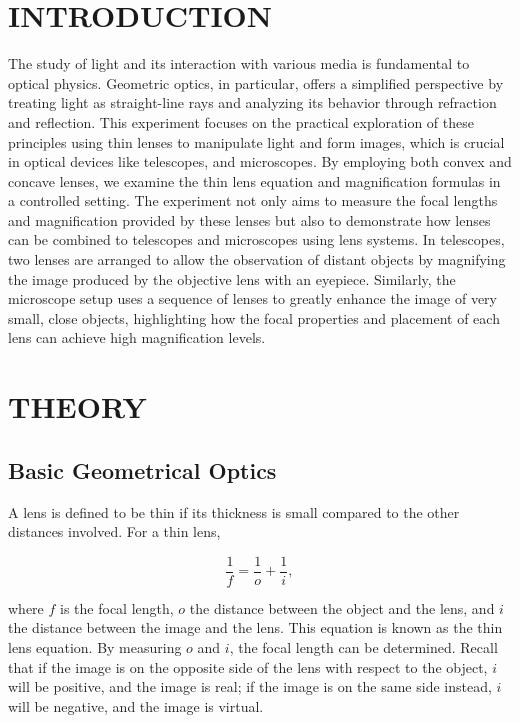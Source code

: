 \documentclass[a4paper,11pt]{article}
\begin{document}
\section*{\center INTRODUCTION}
\label{sec:INTRODUCTION}
\quad 
The study of light and its interaction with various media is fundamental to optical physics. Geometric optics, in particular, offers a simplified perspective by treating light as straight-line rays and analyzing its behavior through refraction and reflection. This experiment focuses on the practical exploration of these principles using thin lenses to manipulate light and form images, which is crucial in optical devices like telescopes, and microscopes. By employing both convex and concave lenses, we examine the thin lens equation and magnification formulas in a controlled setting. The experiment not only aims to measure the focal lengths and magnification provided by these lenses but also to demonstrate how lenses can be combined to telescopes and microscopes using lens systems. In telescopes, two lenses are arranged to allow the observation of distant objects by magnifying the image produced by the objective lens with an eyepiece. Similarly, the microscope setup uses a sequence of lenses to greatly enhance the image of very small, close objects, highlighting how the focal properties and placement of each lens can achieve high magnification levels.
\newpage
{}
\section*{\center THEORY}
\label{sec:THEORY}
\subsection*{Basic Geometrical Optics}

A lens is defined to be thin if its thickness is small compared to the other distances involved. For a thin lens,

\begin{equation}
\frac{1}{f} = \frac{1}{o} + \frac{1}{i},
\end{equation}

where \(f\) is the focal length, \(o\) the distance between the object and the lens, and \(i\) the distance between the image and the lens. This equation is known as the thin lens equation. By measuring \(o\) and \(i\), the focal length can be determined. Recall that if the image is on the opposite side of the lens with respect to the object, \(i\) will be positive, and the image is real; if the image is on the same side instead, \(i\) will be negative, and the image is virtual.\\
\end{document}

